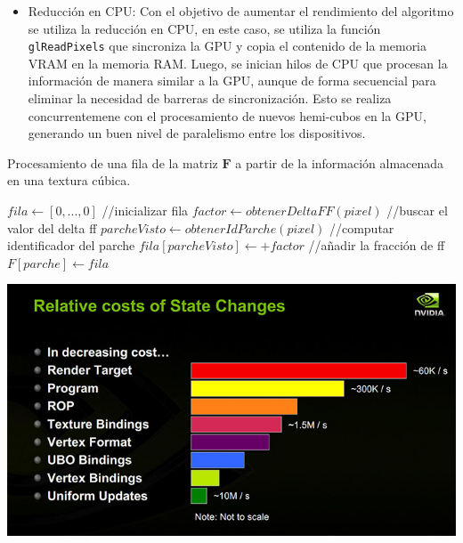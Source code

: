 \begin{enumerate}
\begin{itemize}
		\item Reducción en CPU: Con el objetivo de aumentar el rendimiento del algoritmo se utiliza la reducción en CPU, en este caso, se utiliza la función \verb|glReadPixels| que sincroniza la GPU y copia el contenido de la memoria VRAM en la memoria RAM. Luego, se inician hilos de CPU que procesan la información de manera similar a la GPU, aunque de forma secuencial para eliminar la necesidad de barreras de sincronización.  Esto se realiza concurrentemene con el procesamiento de nuevos hemi-cubos en la GPU, generando un buen nivel de paralelismo entre los dispositivos.
	\end{itemize}
 \end{enumerate}

\begin{algorithm}
\caption{Procesamiento de una fila de la matriz $\mathbf{F}$ a partir de la información almacenada en una textura cúbica.}
\label{alg:processHemicube}

\begin{algorithmic}
			\State $fila \gets [0,...,0]$ //inicializar fila
				\State $factor \gets obtenerDeltaFF(pixel)$ //buscar el valor del delta ff
				\State $parcheVisto \gets obtenerIdParche(pixel)$ //computar identificador del parche
					\State $fila[parcheVisto] \gets + factor$ //añadir la fracción de ff
				\EndIf
			\EndLoop
			\State $F[parche] \gets  fila$
		\EndFunction
\end{algorithmic}
\end{algorithm}

\begin{minipage}[htbp]{\linewidth}
	\centering
	\includegraphics[width=0.6\linewidth]{assets/statecosts}
	\label{img:statechangescost}
\end{minipage}

